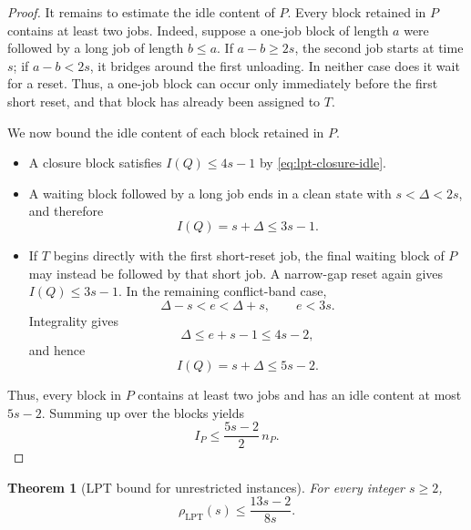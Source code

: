 \documentclass[11pt]{article}
\newtheorem{theorem}{Theorem}
\begin{document}
\begin{proof}
It remains to estimate the idle content of \(P\). Every block retained in
\(P\) contains at least two jobs. Indeed, suppose a one-job block of length
\(a\) were followed by a long job of length \(b\le a\). If
\(a-b\ge2s\), the second job starts at time \(s\); if \(a-b<2s\), it bridges
around the first unloading. In neither case does it wait for a reset. Thus, a
one-job block can occur only immediately before the first short reset, and that
block has already been assigned to \(T\).

We now bound the idle content of each block retained in \(P\).

\begin{itemize}
\item A closure block satisfies \(I(Q)\le4s-1\) by
      \eqref{eq:lpt-closure-idle}.
\item A waiting block followed by a long job ends in a clean state with
      \(s<\Delta<2s\), and therefore
      \[
      I(Q)=s+\Delta\le3s-1.
      \]
\item If \(T\) begins directly with the first short-reset job, the final
      waiting block of \(P\) may instead be followed by that short job. A
      narrow-gap reset again gives \(I(Q)\le3s-1\). In the remaining
      conflict-band case,
      \[
      \Delta-s<e<\Delta+s,
      \qquad e<3s.
      \]
      Integrality gives
      \[
      \Delta\le e+s-1\le4s-2,
      \]
      and hence
      \[
      I(Q)=s+\Delta\le5s-2.
      \]
\end{itemize}

Thus, every block in \(P\) contains at least two jobs and has an idle content at
most \(5s-2\). Summing up over the blocks yields
\[
I_P\le\frac{5s-2}{2}\,n_P.
\]
\end{proof}

\begin{theorem}[LPT bound for unrestricted instances]
\label{thm:lpt-unrestricted-upper}
For every integer \(s\ge2\),
\[
\boxed{
\rho_{\mathrm{LPT}}(s)
\le
\frac{13s-2}{8s}.
}
\]
\end{theorem}
\end{document}
